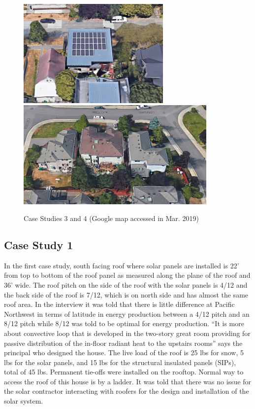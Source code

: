\documentclass[]{article}
\begin{document}
\begin{figure}
\includegraphics[width=2.95in]{../case_studies/case3/google} \includegraphics[width=3.86in]{../case_studies/case4/google} \caption{Case Studies 3 and 4 (Google map accessed in Mar. 2019)}\label{fig:unnamed-chunk-4}
\end{figure}

\hypertarget{case-study-1}{%
\subsection{Case Study 1}\label{case-study-1}}

In the first case study, south facing roof where solar panels are
installed is 22' from top to bottom of the roof panel as measured along
the plane of the roof and 36' wide. The roof pitch on the side of the
roof with the solar panels is 4/12 and the back side of the roof is
7/12, which is on north side and has almost the same roof area. In the
interview it was told that there is little difference at Pacific
Northwest in terms of latitude in energy production between a 4/12 pitch
and an 8/12 pitch while 8/12 was told to be optimal for energy
production. ``It is more about convective loop that is developed in the
two-story great room providing for passive distribution of the in-floor
radiant heat to the upstairs rooms'' says the principal who designed the
house. The live load of the roof is 25 lbs for snow, 5 lbs for the solar
panels, and 15 lbs for the structural insulated panels (SIPs), total of
45 lbs. Permanent tie-offs were installed on the rooftop. Normal way to
access the roof of this house is by a ladder. It was told that there was
no issue for the solar contractor interacting with roofers for the
design and installation of the solar system.
\end{document}
